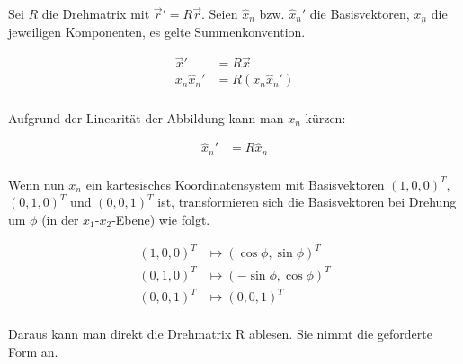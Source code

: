 \documentclass[a4paper,german,12pt,smallheadings]{scrartcl}
\begin{document}
Sei $R$ die Drehmatrix mit $\vec{r}' = R\vec{r}$. Seien $\widehat{x}_n$ bzw.
$\widehat{x}_n'$ die Basisvektoren, $x_n$ die jeweiligen Komponenten, es gelte
Summenkonvention.

\begin{align*}
  \vec{x}' &= R \vec{x} \\
  x_n\widehat{x}_n' &= R(x_n\widehat{x}_n') \\
\end{align*}

Aufgrund der Linearität der Abbildung kann man $x_n$ kürzen:

\begin{align*}
  \widehat{x}_n' &= R\widehat{x}_n \\
\end{align*}

Wenn nun $x_n$ ein kartesisches Koordinatensystem mit Basisvektoren
$(1,0,0)^T$, $(0,1,0)^T$ und $(0,0,1)^T$ ist, transformieren sich die
Basisvektoren bei Drehung um $\phi$ (in der $x_1$-$x_2$-Ebene) wie folgt.

\begin{align*}
  (1, 0, 0)^T &\mapsto (\cos \phi, \sin \phi)^T \\
  (0, 1, 0)^T &\mapsto (-\sin \phi, \cos \phi)^T \\
  (0, 0, 1)^T &\mapsto (0,0,1)^T \\
\end{align*}

Daraus kann man direkt die Drehmatrix R ablesen. Sie nimmt die geforderte Form
an.
\end{document}
